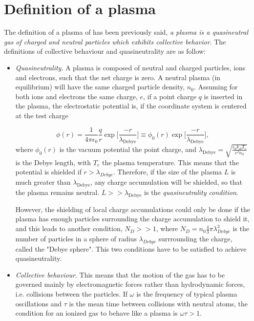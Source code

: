 \documentclass[a4paper,12pt,oneside]{book}
\begin{document}

\section{Definition of a plasma}

The definition of a plasma of \cite{Chen} has been previously said, \textit{a plasma is a quasineutral gas of charged and neutral particles which exhibits collective behavior}. The definitions of collective behaviour and quasineutrality are as follow:%

\begin{itemize}

\item \textit{Quasineutrality}. A plasma is composed of neutral and charged particles, ions and electrons, such that the net charge is zero. A neutral plasma (in equilibrium) will have the same charged particle density, $n_0$. Assuming for both ions and electrons the same charge, $e$, if a point charge $q$ is inserted in the plasma, the electrostatic potential is, if the coordinate system is centered at the test charge

\begin{equation}
\phi(r)=\dfrac{1}{4 \pi \epsilon_0}\dfrac{q}{r} \exp \Big[\frac{-r}{\lambda_{\text{Debye}}} \Big] \equiv \phi_0(r) \exp \Big[\frac{-r}{\lambda_{\text{Debye}}} \Big],
\end{equation}
%
where $\phi_0(r)$ is the vacuum potential the  point charge, and $\lambda_{\text{Debye}}=\sqrt{\frac{\epsilon_0 k_B T_e}{e^2 n_0}}$ is the Debye length, with $T_e$ the plasma temperature. This means that the potential is shielded if $r> \lambda_{Debye}$. Therefore, if the size of the plasma $L$ is much greater than $\lambda_{\text{Debye}}$, any charge accumulation will be shielded, so that the plasma remains neutral. $L>>\lambda_{\text{Debye}}$ is the\textit{ quasineutrality condition}. 

However, the shielding of local charge accumulations could only be done if the plasma has enough particles surrounding the charge accumulation to shield it, and this leads to another condition, $N_D>>1$, where $N_D=n_0 \frac{4}{3} \pi  \lambda_{Debye}^3$ is the number of particles in a sphere of radius $\lambda_{Debye}$ surrrounding the charge, called the "Debye sphere". This two conditions have to be satisfied to achieve quasineutrality.

\item \textit{Collective behaviour}. This means that the motion of the gas has to be governed mainly by electromagnetic forces rather than hydrodynamic forces, i.e. collisions between the particles. If $\omega$ is the frequency of typical plasma oscillations and $\tau$ is the mean time between collisions with neutral atoms, the condition for an ionized gas to behave like a plasma is $\omega \tau>1$.

\end{itemize}
\end{document}
